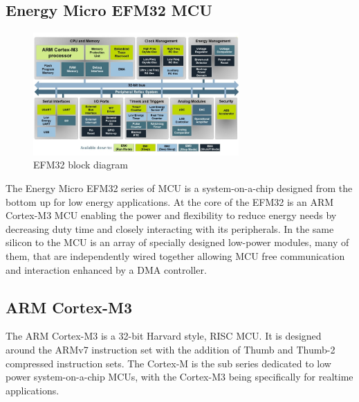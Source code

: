 \subsection{Energy Micro EFM32 \ac{MCU}}

\begin{figure}
  \vspace{-10pt}
  \begin{center}
    \includegraphics[width=0.7\textwidth, keepaspectratio=true]{images/efm32_block_croped.jpg}
  \end{center}
  \caption[EFM32 Block Diagram]{EFM32 block diagram}
  \vspace{-10pt}
\end{figure}

The Energy Micro EFM32 series of \ac{MCU} is a system-on-a-chip designed from the bottom
up for low energy applications. At the core of the EFM32 is an ARM Cortex-M3 \ac{MCU} enabling the
power and flexibility to reduce energy needs by decreasing duty time and closely interacting with its
peripherals. In the same silicon to the \ac{MCU} is an array of specially designed low-power modules,
many of them, that are independently wired together allowing \ac{MCU} free communication and
interaction enhanced by a \ac{DMA} controller.

\subsection{ARM Cortex-M3}
The ARM Cortex-M3 is a 32-bit Harvard style, \ac{RISC} \ac{MCU}. It is designed
around the ARMv7 instruction set with the addition of Thumb
and Thumb-2 compressed instruction sets. The Cortex-M is the sub series dedicated to low power
system-on-a-chip \acp{MCU}, with the Cortex-M3 being specifically for realtime applications.


